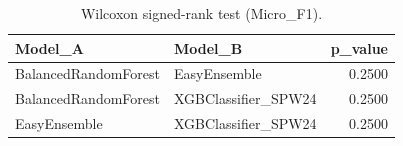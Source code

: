 \begin{table}[t]
\centering
\begin{tabular}{llr}
\toprule
Model_A & Model_B & p_value \\
\midrule
BalancedRandomForest & EasyEnsemble & 0.2500 \\
BalancedRandomForest & XGBClassifier_SPW24 & 0.2500 \\
EasyEnsemble & XGBClassifier_SPW24 & 0.2500 \\
\bottomrule
\end{tabular}
\caption{Wilcoxon signed-rank test (Micro_F1).}
\label{tab:wilcoxon_Micro_F1}
\end{table}